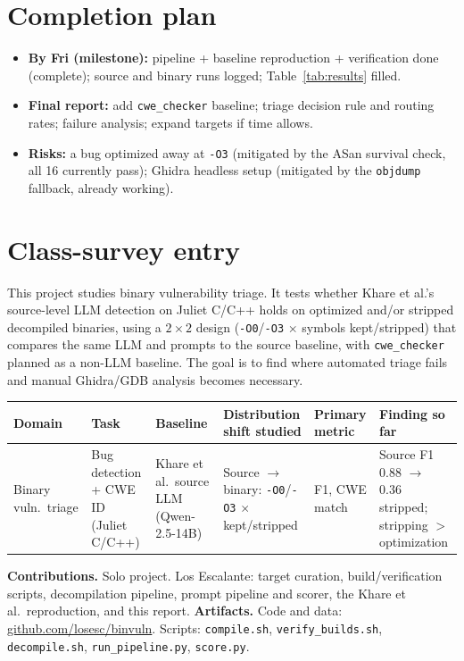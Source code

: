 \documentclass[10pt]{article}
\begin{document}
\section{Completion plan}
\begin{itemize}
\item \textbf{By Fri (milestone):} pipeline + baseline reproduction + verification
done (complete); source and binary runs logged; Table~\ref{tab:results} filled.
\item \textbf{Final report:} add \texttt{cwe\_checker} baseline; triage decision
rule and routing rates; failure analysis; expand targets if time allows.
\item \textbf{Risks:} a bug optimized away at \texttt{-O3} (mitigated by the ASan
survival check, all 16 currently pass); Ghidra headless setup (mitigated by the
\texttt{objdump} fallback, already working).
\end{itemize}

\section*{Class-survey entry}
This project studies binary vulnerability triage. It tests whether Khare et
al.'s source-level LLM detection on Juliet C/C++ holds on optimized and/or
stripped decompiled binaries, using a $2\times2$ design (\texttt{-O0}/\texttt{-O3}
$\times$ symbols kept/stripped) that compares the same LLM and prompts to the
source baseline, with \texttt{cwe\_checker} planned as a non-LLM baseline. The
goal is to find where automated triage fails and manual Ghidra/GDB analysis
becomes necessary.

{\footnotesize\setlength{\tabcolsep}{3pt}\noindent
\begin{tabular}{@{}p{1.5cm}p{2.0cm}p{2.4cm}p{2.6cm}p{1.7cm}p{2.7cm}@{}}
\toprule
Domain & Task & Baseline & Distribution shift studied & Primary metric & Finding so far \\
\midrule
Binary vuln.\ triage & Bug detection + CWE ID (Juliet C/C++) & Khare et al.\ source LLM (Qwen-2.5-14B) &
Source $\to$ binary: \texttt{-O0}/\texttt{-O3} $\times$ kept/stripped & F1, CWE match & Source F1 0.88 $\to$ 0.36 stripped; stripping $>$ optimization \\
\bottomrule
\end{tabular}\par}

{\sloppy\noindent\textbf{Contributions.} Solo project. Los Escalante: target curation, build/verification scripts,
decompilation pipeline, prompt pipeline and scorer, the Khare et al.\
reproduction, and this report.
\textbf{Artifacts.} Code and data: \url{github.com/losesc/binvuln}. Scripts: \texttt{compile.sh},
\texttt{verify\_builds.sh}, \texttt{decompile.sh}, \texttt{run\_pipeline.py},
\texttt{score.py}.\par}
\end{document}
